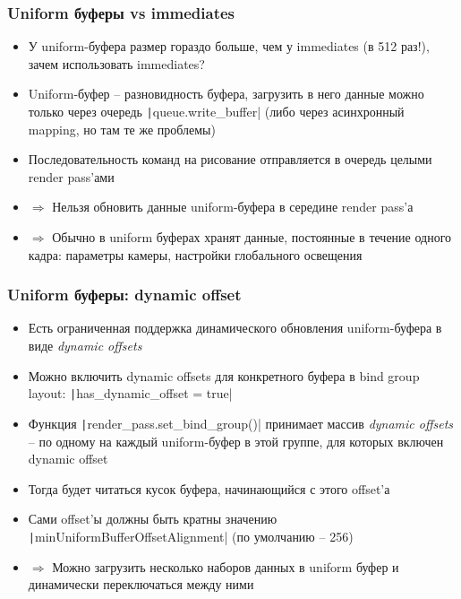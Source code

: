 \documentclass[10pt]{beamer}
\begin{document}
\begin{frame}[fragile]
\frametitle{Uniform буферы vs immediates}
\begin{itemize}
\item У uniform-буфера размер гораздо больше, чем у immediates (в 512 раз!), зачем использовать immediates?
\pause
\item Uniform-буфер -- разновидность буфера, загрузить в него данные можно только через очередь \texttt|queue.write_buffer| (либо через асинхронный mapping, но там те же проблемы)
\pause
\item Последовательность команд на рисование отправляется в очередь целыми render pass'ами
\pause
\item \(\Longrightarrow\) Нельзя обновить данные uniform-буфера в середине render pass'а
\pause
\item \(\Longrightarrow\) Обычно в uniform буферах хранят данные, постоянные в течение одного кадра: параметры камеры, настройки глобального освещения
\end{itemize}
\end{frame}

\begin{frame}[fragile]
\frametitle{Uniform буферы: dynamic offset}
\begin{itemize}
\item Есть ограниченная поддержка динамического обновления uniform-буфера в виде \textit{dynamic offsets}
\pause
\item Можно включить dynamic offsets для конкретного буфера в bind group layout: \texttt|has_dynamic_offset = true|
\pause
\item Функция \texttt|render_pass.set_bind_group()| принимает массив \textit{dynamic offsets} -- по одному на каждый uniform-буфер в этой группе, для которых включен dynamic offset
\pause
\item Тогда будет читаться кусок буфера, начинающийся с этого offset'а
\pause
\item Сами offset'ы должны быть кратны значению \texttt|minUniformBufferOffsetAlignment| (по умолчанию -- 256)
\pause
\item \(\Longrightarrow\) Можно загрузить несколько наборов данных в uniform буфер и динамически переключаться между ними
\end{itemize}
\end{frame}
\end{document}
